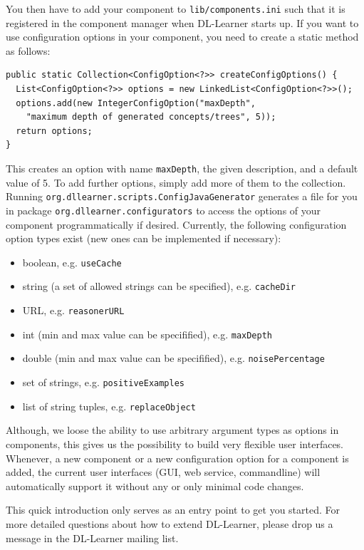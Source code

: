 \documentclass[a4paper,12pt]{scrartcl}
\begin{document}
You then have to add your component to \verb|lib/components.ini| such that it is registered in the component manager when DL-Learner starts up. If you want to use configuration options in your component, you need to create a static method as follows:

\begin{verbatim}
public static Collection<ConfigOption<?>> createConfigOptions() {
  List<ConfigOption<?>> options = new LinkedList<ConfigOption<?>>();
  options.add(new IntegerConfigOption("maxDepth", 
    "maximum depth of generated concepts/trees", 5));
  return options;
}
\end{verbatim}

This creates an option with name \verb|maxDepth|, the given description, and a default value of 5. To add further options, simply add more of them to the collection. Running \verb|org.dllearner.scripts.ConfigJavaGenerator| generates a file for you in package \verb|org.dllearner.configurators| to access the options of your component programmatically if desired. Currently, the following configuration option types exist (new ones can be implemented if necessary):

\begin{itemize}
 \item boolean, e.g. \verb|useCache|
 \item string (a set of allowed strings can be specified), e.g. \verb|cacheDir|
 \item URL, e.g. \verb|reasonerURL|
 \item int (min and max value can be specifified), e.g. \verb|maxDepth|
 \item double (min and max value can be specifified), e.g. \verb|noisePercentage|
 \item set of strings, e.g. \verb|positiveExamples|
 \item list of string tuples, e.g. \verb|replaceObject|
\end{itemize}

Although, we loose the ability to use arbitrary argument types as options in components, this gives us the possibility to build very flexible user interfaces. Whenever, a new component or a new configuration option for a component is added, the current user interfaces (GUI, web service, commandline) will automatically support it without any or only minimal code changes.

This quick introduction only serves as an entry point to get you started. For more detailed questions about how to extend DL-Learner, please drop us a message in the DL-Learner mailing list.
\end{document}
